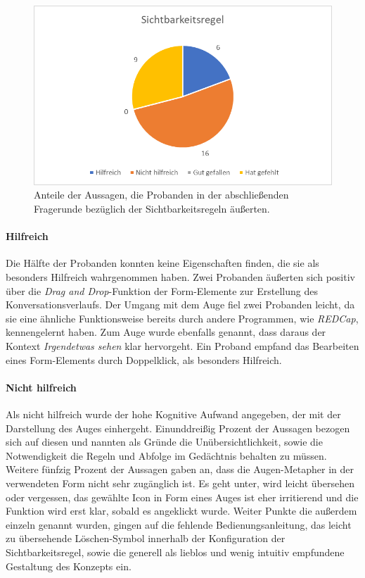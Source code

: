\begin{figure}[h]
\centering
\includegraphics[width=1\textwidth]{pictures/diagramme/aussagensichtb}
\caption{Anteile der Aussagen, die Probanden in der abschließenden Fragerunde bezüglich der Sichtbarkeitsregeln äußerten.}
\label{aussagensichtb}
\end{figure}

\paragraph{Hilfreich}Die Hälfte der Probanden konnten keine Eigenschaften finden, die sie als besonders Hilfreich wahrgenommen haben. Zwei Probanden äußerten sich positiv über die \emph{Drag and Drop}-Funktion der Form-Elemente zur Erstellung des Konversationsverlaufs. Der Umgang mit dem Auge fiel zwei Probanden leicht, da sie eine ähnliche Funktionsweise bereits durch andere Programmen, wie \emph{REDCap}, kennengelernt haben. Zum Auge wurde ebenfalls genannt, dass daraus der Kontext \emph{Irgendetwas sehen} klar hervorgeht. Ein Proband empfand das Bearbeiten eines Form-Elements durch Doppelklick, als besonders Hilfreich.

\paragraph{Nicht hilfreich}Als nicht hilfreich wurde der hohe Kognitive Aufwand angegeben, der mit der Darstellung des Auges einhergeht. Einunddreißig Prozent der Aussagen bezogen sich auf diesen und nannten als Gründe die Unübersichtlichkeit, sowie die Notwendigkeit die Regeln und Abfolge im Gedächtnis behalten zu müssen. Weitere fünfzig Prozent der Aussagen gaben an, dass die Augen-Metapher in der verwendeten Form nicht sehr zugänglich ist. Es geht unter, wird leicht übersehen oder vergessen, das gewählte Icon in Form eines Auges ist eher irritierend und die Funktion wird erst klar, sobald es angeklickt wurde. Weiter Punkte die außerdem einzeln genannt wurden, gingen auf die fehlende Bedienungsanleitung, das leicht zu übersehende Löschen-Symbol innerhalb der Konfiguration der Sichtbarkeitsregel, sowie die generell als lieblos und wenig intuitiv empfundene Gestaltung des Konzepts ein. 

